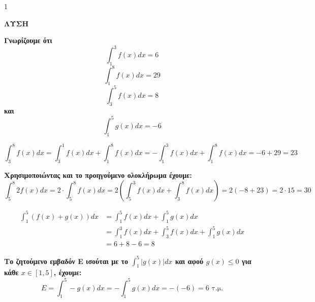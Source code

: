 \begin{ylh}{1}
    \item [Ύλη από εικόνα]
\end{ylh}
\textbf{ΛΥΣΗ}
\begin{alist}
    \item \textbf{Γνωρίζουμε ότι}
    \[ \int_1^3 f(x)dx = 6 \]
    \[ \int_1^8 f(x)dx = 29 \]
    \[ \int_3^5 f(x)dx = 8 \]
    \textbf{και}
    \[ \int_1^5 g(x)dx = -6 \]
    \begin{rlist}
        \item
        \[ \int_3^8 f(x)dx = \int_3^1 f(x)dx + \int_1^8 f(x)dx = -\int_1^3 f(x)dx + \int_1^8 f(x)dx = -6 + 29 = 23 \]
        \item \textbf{Χρησιμοποιώντας και το προηγούμενο ολοκλήρωμα έχουμε:}
        \[ \int_5^8 2f(x)dx = 2 \cdot \int_5^8 f(x)dx = 2 \left( \int_5^3 f(x)dx + \int_3^8 f(x)dx \right) = 2(-8 + 23) = 2 \cdot 15 = 30 \]
        \item
        \begin{align*}
            \int_1^5 (f(x) + g(x))dx &= \int_1^5 f(x)dx + \int_1^5 g(x)dx \\
            &= \int_1^3 f(x)dx + \int_3^5 f(x)dx + \int_1^5 g(x)dx \\
            &= 6 + 8 - 6 = 8
        \end{align*}
    \end{rlist}
    \item \textbf{Το ζητούμενο εμβαδόν Ε ισούται με το $\int_1^5 |g(x)|dx$ και αφού $g(x) \le 0$ για κάθε $x \in [1,5]$, έχουμε:}
    \[ E = \int_1^5 -g(x)dx = - \int_1^5 g(x)dx = -(-6) = 6 \text{ τ.μ.} \]
\end{alist}